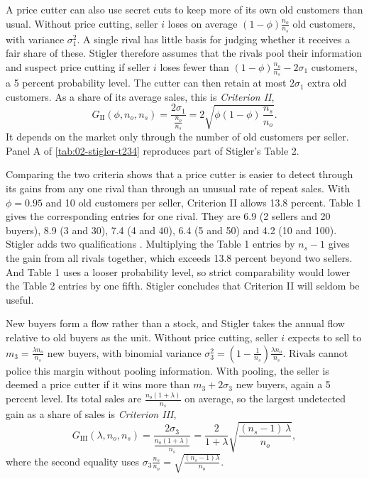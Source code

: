 A price cutter can also use secret cuts to keep more of its own old customers than usual. Without price cutting,
seller $i$ loses on average $(1 - \phi)\frac{n_o}{n_s}$ old customers, with variance $\sigma_1^2$. A single rival
has little basis for judging whether it receives a fair share of these. Stigler therefore assumes that the rivals
pool their information and suspect price cutting if seller $i$ loses fewer than
$(1 - \phi)\frac{n_o}{n_s} - 2\sigma_1$ customers, a 5 percent probability level. The cutter can then retain at most
$2\sigma_1$ extra old customers. As a share of its average sales, this is \emph{Criterion II},
\begin{equation}\label{eq:02-stigler-crit2}
G_{\mathrm{II}}(\phi, n_o, n_s) = \frac{2\sigma_1}{\frac{n_o}{n_s}} = 2\sqrt{\phi(1 - \phi)\,\frac{n_s}{n_o}} .
\end{equation}
It depends on the market only through the number of old customers per seller. Panel A of
\cref{tab:02-stigler-t234} reproduces part of Stigler's Table 2.

Comparing the two criteria shows that a price cutter is easier to detect through its gains from any one rival than
through an unusual rate of repeat sales. With $\phi = 0.95$ and 10 old customers per seller, Criterion II allows
13.8 percent. Table 1 gives the corresponding entries for one rival. They are 6.9 (2 sellers and 20 buyers), 8.9
(3 and 30), 7.4 (4 and 40), 6.4 (5 and 50) and 4.2 (10 and 100). Stigler adds two qualifications \citep[footnote 9]{Stigler1964}.
Multiplying the Table 1 entries by $n_s - 1$ gives the gain from all rivals together, which exceeds 13.8 percent
beyond two sellers. And Table 1 uses a looser probability level, so strict comparability would lower the Table 2
entries by one fifth. Stigler concludes that Criterion II will seldom be useful.

New buyers form a flow rather than a stock, and Stigler takes the annual flow relative to old buyers as the unit.
Without price cutting, seller $i$ expects to sell to $m_3 = \frac{\lambda n_o}{n_s}$ new buyers, with binomial
variance $\sigma_3^2 = \left(1 - \frac{1}{n_s}\right)\frac{\lambda n_o}{n_s}$. Rivals cannot police this margin without
pooling information. With pooling, the seller is deemed a price cutter if it wins more than $m_3 + 2\sigma_3$ new
buyers, again a 5 percent level. Its total sales are $\frac{n_o(1 + \lambda)}{n_s}$ on average, so the largest
undetected gain as a share of sales is \emph{Criterion III},
\begin{equation}\label{eq:02-stigler-crit3}
G_{\mathrm{III}}(\lambda, n_o, n_s) = \frac{2\sigma_3}{\frac{n_o(1 + \lambda)}{n_s}}
= \frac{2}{1 + \lambda}\sqrt{\frac{(n_s - 1)\,\lambda}{n_o}} ,
\end{equation}
where the second equality uses $\sigma_3\frac{n_s}{n_o} = \sqrt{\frac{(n_s - 1)\lambda}{n_o}}$.

